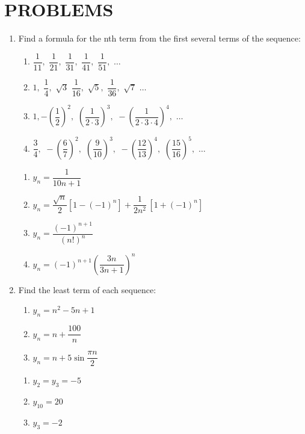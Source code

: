 

\chapter*{PROBLEMS}
\label{problems}
\begin{enumerate}[label=\textcolor{IndianRed}{Problem \arabic*},leftmargin=2cm]
\item Find a formula for the nth term from the first several terms of the sequence:
\begin{enumerate}[label=(\alph*)]
\item $\dfrac{1}{11}, \,\,\dfrac{1}{21}, \,\,\dfrac{1}{31}, \,\,\dfrac{1}{41}, \,\,\dfrac{1}{51}, \,\, \ldots$
\item $1, \,\, \dfrac{1}{4}, \,\, \sqrt{3} \,\, \dfrac{1}{16}, \,\, \sqrt{5}, \,\, \dfrac{1}{36}, \,\, \sqrt{7} \,\, \ldots$
\item $ 1, - \left(\dfrac{1}{2} \right)^{2}, \,\, \left(\dfrac{1}{2 \cdot 3} \right)^{3}, \,\, - \left(\dfrac{1}{2 \cdot 3 \cdot 4} \right)^{4}, \,\, \ldots $
\item  $\dfrac{3}{4}, \,\, - \left(\dfrac{6}{7} \right)^{2}, \,\, \left(\dfrac{9}{10} \right)^{3}, \,\, - \left(\dfrac{12}{13} \right)^{4}, \,\, \left(\dfrac{15}{16} \right)^{5}, \,\, \ldots $
\end{enumerate}
\Answer 
\begin{enumerate}[label=(\alph*)]
\item $y_{n} = \dfrac{1}{10n+1}$ 
\item $y_{n} = \dfrac{\sqrt{n}}{2} [1 - ( -1)^{n}] + \dfrac{1}{2n^{2}} \, [1 + (-1)^{n}]$
\item $y_{n} = \dfrac{(-1)^{n+1}}{(n!)^{n}} $
\item $y_{n} = (-1)^{n+1} \left( \dfrac{3n}{3n+1} \right)^{n} $
\end{enumerate}

\item Find the least term of each sequence:
\begin{enumerate}[label=(\alph*)]
\item $y_{n} = n^{2} -5n + 1 $
\item $y_{n} = n + \dfrac{100}{n}$ 
\item $y_{n} = n + 5 \sin\dfrac{\pi n}{2}$ 
\end{enumerate}
\Answer
\begin{enumerate}[label=(\alph*)]
\item $  y_{2} = y_{3}= -5$
\item $ y_{10} = 20 $
\item $ y_{3} = -2$
\end{enumerate}


\end{enumerate}
